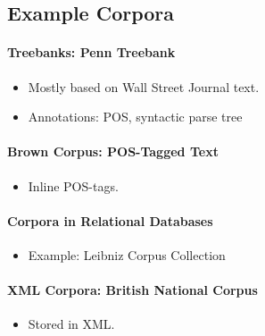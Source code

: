 		\subsection{Example Corpora} %
			\paragraph{Treebanks: Penn Treebank} %
				\begin{itemize}
					\item Mostly based on Wall Street Journal text.
					\item Annotations: POS, syntactic parse tree
				\end{itemize}

			\paragraph{Brown Corpus: POS-Tagged Text} %
				\begin{itemize}
					\item Inline POS-tags.
				\end{itemize}

			\paragraph{Corpora in Relational Databases} %
				\begin{itemize}
					\item Example: Leibniz Corpus Collection
				\end{itemize}

			\paragraph{XML Corpora: British National Corpus} %
				\begin{itemize}
					\item Stored in XML.
				\end{itemize}

